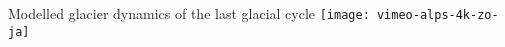 \begin{CJK}{UTF8}{min}
%
%

    \begin{frame}{Modelled glacier dynamics of the last glacial cycle}
      \texttt{[image: vimeo-alps-4k-zo-ja]}\\
    \end{frame}


\end{CJK}
